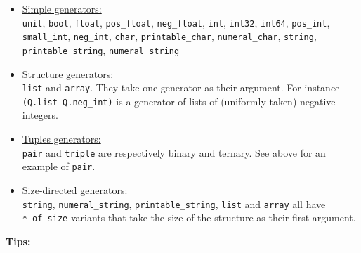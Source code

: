 \begin{itemize}
\item  \underline{Simple generators:}\\
\texttt{unit}, \texttt{bool}, \texttt{float}, \texttt{pos\_float},
\texttt{neg\_float}, \texttt{int}, \texttt{int32}, \texttt{int64}, \texttt{pos\_int}, \texttt{small\_int},
\texttt{neg\_int}, \texttt{char}, \texttt{printable\_char}, \texttt{numeral\_char},
\texttt{string}, \texttt{printable\_string},
\texttt{numeral\_string}

\item \underline{Structure generators:}\\
\texttt{list} and \texttt{array}. They take one generator as their argument. For instance
\texttt{(Q.list Q.neg\_int)} is a generator of lists of (uniformly taken) negative integers.

\item \underline{Tuples generators:}\\
\texttt{pair} and \texttt{triple} are respectively binary and ternary. See above for an example of
\texttt{pair}.

\item \underline{Size-directed generators:}\\
\texttt{string}, \texttt{numeral\_string}, \texttt{printable\_string}, \texttt{list}
and \texttt{array} all have \texttt{*\_of\_size}
variants that take the size of the structure as their first argument.
\end{itemize}

\textbf{Tips:}

